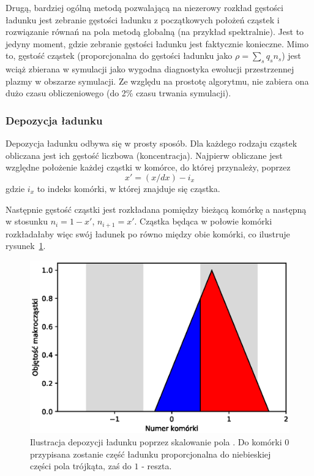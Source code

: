 Drugą, bardziej ogólną metodą pozwalającą na niezerowy rozkład gęstości
ładunku jest zebranie gęstości ładunku z początkowych położeń cząstek i
rozwiązanie równań na pola metodą globalną (na przykład spektralnie). Jest
to jedyny moment, gdzie zebranie gęstości ładunku jest faktycznie konieczne.
Mimo to, gęstość cząstek (proporcjonalna do gęstości ładunku jako $\rho =
\sum_s q_s n_s$) jest wciąż zbierana w symulacji jako wygodna diagnostyka
ewolucji przestrzennej plazmy w obszarze symulacji. Ze względu na prostotę
algorytmu, nie zabiera ona dużo czasu obliczeniowego (do
2\% czasu trwania symulacji).

\subsubsection{Depozycja ładunku}

 Depozycja ładunku odbywa się w prosty sposób. Dla każdego rodzaju
cząstek obliczana jest ich gęstość liczbowa (koncentracja). Najpierw
obliczane jest względne położenie każdej cząstki w komórce, do której
przynależy, poprzez
\begin{equation}
x' = (x/dx) - i_x
\label{eqn:relative-position}
\end{equation}
gdzie $i_x$ to indeks komórki, w której znajduje się cząstka.

Następnie gęstość cząstki jest rozkładana pomiędzy bieżącą komórkę a
następną w stosunku $n_i = 1-x'$, $n_{i+1} = x'$. Cząstka będąca
w połowie komórki rozkładałaby  więc swój ładunek po równo między obie
komórki, co ilustruje rysunek~\ref{fig:charge-deposition}.


\begin{figure}[h!]
  \includegraphics[width=\textwidth]{Images/charge-deposition}
  \caption{Ilustracja depozycji ładunku poprzez skalowanie pola . Do komórki $0$ przypisana zostanie część ładunku proporcjonalna do
niebieskiej części pola trójkąta, zaś do $1$ - reszta.\label{fig:charge-deposition}}
\end{figure} %

